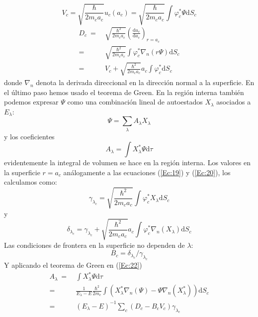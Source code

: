 \documentclass[fleqn,10pt]{SelfArx} %
\newcommand{\parentesis}[1]{\left( #1  \right)}
\newcommand{\D}{\mathrm{d}}
\newcommand{\derivadas}[2]{\frac{\D #1}{\D #2}}
\begin{document}
\begin{equation}
	V_c = \sqrt{\frac{\hbar}{2m_c a_c}}u_c (a_c) = \sqrt{\frac{\hbar}{2m_c a_c}} \int \varphi_c^* \Psi \D S_c \label{Ec:19}
\end{equation}
\begin{equation}
	\begin{split}
  D_c \ = & \ \sqrt{\frac{\hbar^2 }{2m_c a_c}}  \parentesis{ \derivadas{u_c}{a_c}}_{r=a_c} \\ = & \ \sqrt{\frac{\hbar^2}{2m_c a_c}} \int \varphi_c^* \nabla_n(r\Psi) \D S_c \\
  = &  \ V_c + \sqrt{\frac{\hbar^2}{2m_c a_c}} a_c \int \varphi_c^* \D S_c
  \end{split} \label{Ec:20}
\end{equation}
donde $\nabla_n$ denota la derivada direccional en la dirección normal a la superficie. En el último paso hemos usado el teorema de Green. En la región interna también podemos expresar $\Psi$ como una combinación lineal de autoestados $X_\lambda$ asociados a $E_\lambda$:
\begin{equation}
	\Psi = \sum_\lambda A_\lambda X_\lambda
\end{equation} 
y los coeficientes 
\begin{equation}
	A_\lambda = \int X_\lambda^* \Psi \D \tau \label{Ec:22}
\end{equation}
evidentemente la integral de volumen se hace en la región interna. Los valores en la superficie $r=a_c$ análogamente a las ecuaciones (\ref{Ec:19}) y (\ref{Ec:20}), los calculamos como:
\begin{equation}
	\gamma_{\lambda_c} =  \sqrt{\frac{\hbar^2 }{2m_c a_c}} \int \varphi_c^* X_\lambda \D S_c \label{Ec:23}
\end{equation}
y
\begin{equation}
	\delta_{\lambda_c} = \gamma_{\lambda_c} +   \sqrt{\frac{\hbar^2 }{2m_c a_c}} a_c \int \varphi_c^*   \nabla_n (X_\lambda) \D S_c
\end{equation}
Las condiciones de frontera en la superficie no dependen de $\lambda$:
\begin{equation}
	B_c = \delta_{\lambda_c} / \gamma_{\lambda_c}
\end{equation}
Y aplicando el teorema de Green en (\ref{Ec:22})
\begin{equation}
	\begin{split}
	A_\lambda \ = & \ \int X_\lambda^* \Psi \D\tau  \\
	= & \ \frac{1}{E_\lambda - E} \frac{\hbar^2}{2m_c} \int \parentesis{X_\lambda^* \nabla_n (\Psi) - \Psi \nabla_n (X_\lambda^*)} \D S_c \\
	= & \ (E_\lambda - E)^{-1} \sum_{c} (D_c - B_c V_c) \gamma_{\lambda_c}
	\end{split}
\end{equation}
\end{document}
